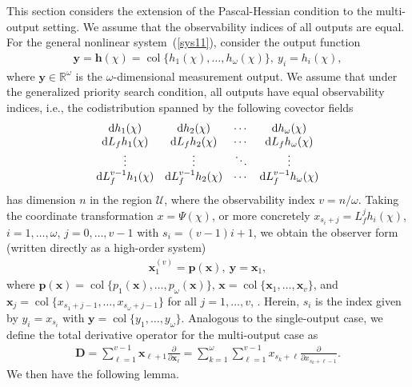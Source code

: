 \documentclass[11pt]{article}
\DeclareMathOperator{\col}{col}
\begin{document}
This section considers the extension of the Pascal-Hessian condition to the multi-output setting. We assume that the observability indices of all outputs are equal. For the general nonlinear system~(\ref{sys11}), consider the output function
\begin{align}
	\bm{y}=\bm{h}(\chi)=\col\{h_1(\chi),\ldots,h_\omega(\chi)\},~y_i=h_i(\chi),\label{sys13}
\end{align}
where $\bm{y}\in\mathbb{R}^\omega$ is the $\omega$-dimensional measurement output. We assume that under the generalized priority search condition, all outputs have equal observability indices, i.e., the codistribution spanned by the following covector fields
\begin{align}\label{mspan}
	\begin{matrix}
		{\rm d}h_1(\chi)&{\rm d}h_2(\chi)&\cdots&{\rm d}h_\omega(\chi)\\
		{\rm d}L_fh_1(\chi)&{\rm d}L_fh_2(\chi)&\cdots&{\rm d}L_fh_\omega(\chi)\\
		\vdots&\vdots&\ddots&\vdots\\
		{\rm d}L_f^{v-1}h_1(\chi)&{\rm d}L_f^{v-1}h_2(\chi)&\cdots&{\rm d}L_f^{v-1}h_\omega(\chi)\\
	\end{matrix}
\end{align}
has dimension $n$ in the region $\mathcal{U}$, where the observability index $v=n/\omega$. Taking the coordinate transformation $x=\Psi(\chi)$, or more concretely $x_{s_i+j}=L_f^{j}h_i(\chi)$, $i=1,\ldots,\omega$, $j=0,\ldots,v-1$ with $s_i=(v-1)i+1$, we obtain the observer form (written directly as a high-order system)
\begin{align}
	\bm{x}_1^{(v)}=\bm{p}(\bm{x}),~\bm{y}=\bm{x}_1,\label{fms:mo}
\end{align}
where $\bm{p}(\bm{x})=\col\{p_1(\bm{x}),\ldots,p_\omega(\bm{x})\}$, $\bm{x}=\col\{\bm{x}_1,\ldots,\bm{x}_v\}$, and $\bm{x}_j=\col\{x_{s_1+j-1},\ldots,x_{s_\omega+j-1}\}$ for all $j=1,\ldots,v$, . Herein, $s_i$ is the index given by $y_i=x_{s_i}$ with $\bm{y}=\col\{y_1,\ldots,y_\omega\}$. Analogous to the single-output case, we define the total derivative operator for the multi-output case as
\begin{align}
	\bm{D}=\sum_{\ell=1}^{v-1}\bm{x}_{\ell+1}\frac{\partial}{\partial \bm{x}_{\ell}}=\sum_{k=1}^\omega\sum_{\ell=1}^{v-1}x_{s_k+\ell}\frac{\partial}{\partial x_{s_k+\ell-1}}.
\end{align}
We then have the following lemma.
\end{document}
